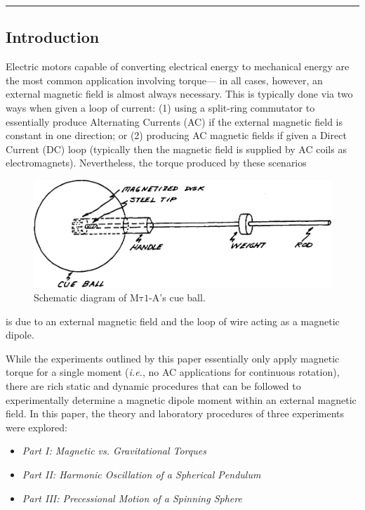 \documentclass[12pt]{article}
\newcommand{\mtauonea}{\mathrm{M\tau1}\text{-}\mathrm{A}}
\begin{document}
\noindent\rule{\linewidth}{0.5pt}

\begin{multicols}{2}

\subsection{Introduction}
Electric motors capable of converting electrical energy to mechanical energy are the most common application involving torque---
in all cases, however, an external magnetic field is almost always necessary.
This is typically done via two ways when given a loop of current:
(1) using a split-ring commutator to essentially produce Alternating Currents (AC) if the external magnetic field is constant in one direction; 
or (2) producing AC magnetic fields if given a Direct Current (DC) loop (typically then the magnetic field is supplied by AC coils as electromagnets).
Nevertheless, the torque produced by these scenarios
\begin{figure}[H]
    \centering
    \includegraphics[width=0.98\linewidth]{figs/fig1.png}
    \caption{Schematic diagram of $\mtauonea$'s cue ball.}
\end{figure}
\noindent
is due to an external magnetic field and the loop of wire acting as a magnetic dipole.

While the experiments outlined by this paper essentially only apply magnetic torque for a single moment (\textit{i.e.}, no AC applications for continuous rotation),
there are rich static and dynamic procedures that can be followed to experimentally determine a magnetic dipole moment within an external magnetic field.
In this paper, the theory and laboratory procedures of three experiments were explored:
\begin{itemize}
    \item[] \textit{Part I: Magnetic vs. Gravitational Torques}
    \item[] \textit{Part II: Harmonic Oscillation of a Spherical Pendulum}
    \item[] \textit{Part III: Precessional Motion of a Spinning Sphere}
\end{itemize}


\end{multicols}
\end{document}

